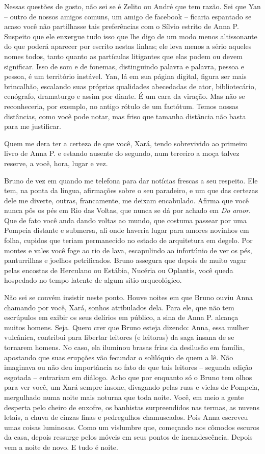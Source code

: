 Nessas questões de gosto, não sei se é Zelito ou André que tem razão.
Sei que Yan -- outro de nossos amigos comuns, um amigo de facebook --
ficaria espantado se acaso você não partilhasse tais preferências com o
Sílvio estrito de Anna P. Suspeito que ele enxergue tudo isso que lhe
digo de um modo menos altissonante do que poderá aparecer por escrito
nestas linhas; ele leva menos a sério aqueles nomes todos, tanto quanto
as partículas litigantes que elas podem ou devem significar. Isso de som
e de fonemas, distinguindo palavra e palavra, pessoa e pessoa, é um
território instável. Yan, lá em sua página digital, figura ser mais
brincalhão, escalando suas próprias qualidades abecedadas de ator,
bibliotecário, cenógrafo, dramaturgo e assim por diante. É um cara da
viração. Mas não se reconheceria, por exemplo, no antigo rótulo de um
factótum. Temos nossas distâncias, como você pode notar, mas friso que
tamanha distância não basta para me justificar.

Quem me dera ter a certeza de que você, Xará, tendo sobrevivido ao
primeiro livro de Anna P. e estando ausente do segundo, num terceiro a
moça talvez reserve, a você, hora, lugar e vez.

Bruno de vez em quando me telefona para dar notícias frescas a seu
respeito. Ele tem, na ponta da língua, afirmações sobre o seu paradeiro,
e um que das certezas dele me diverte, outras, francamente, me deixam
encabulado. Afirma que você nunca pôs os pés em Rio das Voltas, que
nunca se dá por achado em \emph{Do amor}. Que de fato você anda dando
voltas ao mundo, que costuma passear por uma Pompeia distante e
submersa, ali onde haveria lugar para amores novinhos em folha, cupidos
que teriam permanecido no estado de arquitetura em degelo. Por montes e
vales você foge ao rio de lava, escapulindo ao infortúnio de ver os pés,
panturrilhas e joelhos petrificados. Bruno assegura que depois de muito
vagar pelas encostas de Herculano ou Estábia, Nucéria ou Oplantis, você
queda hospedado no tempo latente de algum sítio arqueológico.

Não sei se convém insistir neste ponto. Houve noites em que Bruno ouviu
Anna chamando por você, Xará, sonhos atribulados dela. Para ele, que não
tem escrúpulos em exibir os seus delírios em público, a sina de Anna P.
alcança muitos homens. Seja. Quero crer que Bruno esteja dizendo: Anna,
essa mulher vulcânica, contribui para libertar leitores (e leitoras) da
saga insana de se tornarem homens. No caso, ela iluminou brasas frias da
desilusão em família, apostando que suas erupções vão fecundar o
solilóquio de quem a lê. Não imaginava ou não deu importância ao fato de
que tais leitores -- segunda edição esgotada -- entrariam em diálogo.
Acho que por enquanto só o Bruno tem olhos para ver você, um Xará sempre
insone, divagando pelas ruas e vielas de Pompeia, mergulhado numa noite
mais noturna que toda noite. Você, em meio a gente desperta pelo cheiro
de enxofre, os banhistas surpreendidos nas termas, as nuvens letais, a
chuva de cinzas finas e pedregulhos chamuscados. Pois Anna escreveu umas
coisas luminosas. Como um vislumbre que, começando nos cômodos escuros
da casa, depois ressurge pelos móveis em seus pontos de incandescência.
Depois vem a noite de novo. E tudo é noite.

